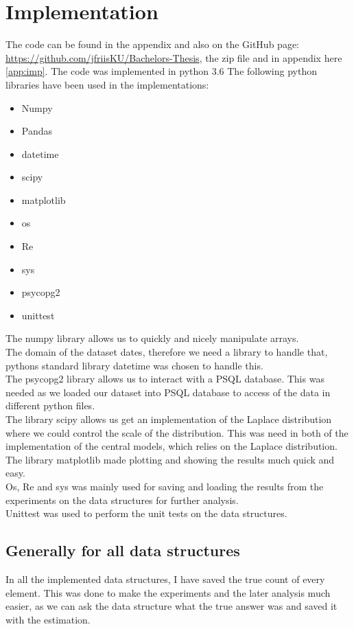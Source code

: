 \documentclass[11pt]{article}
\theoremstyle{definition}
\begin{document}
\section{Implementation}
The code can be found in the appendix and also on the GitHub page: \url{https://github.com/jfriisKU/Bachelors-Thesis}, the zip file and in appendix here \ref{app:imp}. The code was implemented in python 3.6
The following python libraries have been used in the implementations: 
\begin{multicols}{2}
\begin{itemize}
    \item Numpy
    \item Pandas
    \item datetime
    \item scipy
    \item matplotlib
    \item os
    \item Re
    \item sys
    \item psycopg2
    \item unittest
\end{itemize}
\end{multicols}

The numpy library allows us to quickly and nicely manipulate arrays. \\ The domain of the dataset dates, therefore we need a library to handle that, pythons standard library datetime was chosen to handle this. \\ The psycopg2 library allows us to interact with a PSQL database. This was needed as we loaded our dataset into PSQL database to access of the data in different python files. \\ 
The library scipy allows us get an implementation of the Laplace distribution where we could control the scale of the distribution. This was need in both of the implementation of the central models, which relies on the Laplace distribution. \\
The library matplotlib made plotting and showing the results much quick and easy. \\
Os, Re and sys was mainly used for saving and loading the results from the experiments on the data structures for further analysis.\\
Unittest was used to perform the unit tests on the data structures.

\subsection{Generally for all data structures}
In all the implemented data structures, I have saved the true count of every element. This was done to make the experiments and the later analysis much easier, as we can ask the data structure what the true answer was and saved it with the estimation. 
\end{document}
